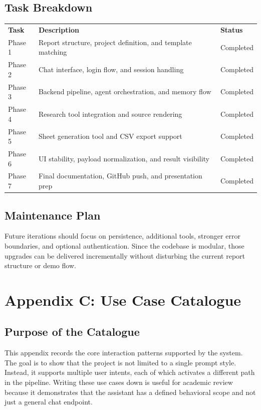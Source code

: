 \documentclass[11pt,oneside]{report}
\begin{document}
\section{Task Breakdown}
\begin{longtable}{p{}p{}p{}}
\textbf{Task} & \textbf{Description} & \textbf{Status} \\
Phase 1 & Report structure, project definition, and template matching & Completed \\
Phase 2 & Chat interface, login flow, and session handling & Completed \\
Phase 3 & Backend pipeline, agent orchestration, and memory flow & Completed \\
Phase 4 & Research tool integration and source rendering & Completed \\
Phase 5 & Sheet generation tool and CSV export support & Completed \\
Phase 6 & UI stability, payload normalization, and result visibility & Completed \\
Phase 7 & Final documentation, GitHub push, and presentation prep & Completed \\
\end{longtable}

\section{Maintenance Plan}
Future iterations should focus on persistence, additional tools, stronger error boundaries, and optional authentication. Since the codebase is modular, those upgrades can be delivered incrementally without disturbing the current report structure or demo flow.

\chapter{Appendix C: Use Case Catalogue}
\section{Purpose of the Catalogue}
This appendix records the core interaction patterns supported by the system. The goal is to show that the project is not limited to a single prompt style. Instead, it supports multiple user intents, each of which activates a different path in the pipeline. Writing these use cases down is useful for academic review because it demonstrates that the assistant has a defined behavioral scope and not just a general chat endpoint.
\end{document}
